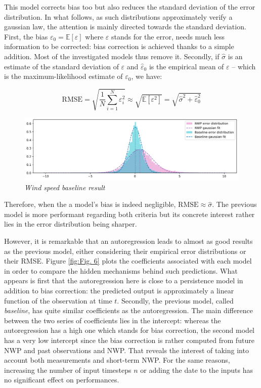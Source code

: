 \documentclass{article}
\newcommand{\saut}{\vspace{10px}}
\begin{document}
This model corrects bias too but also reduces the standard deviation of the error distribution. In what follows,
as such distributions approximately verify a gaussian law, the attention is mainly directed towards the standard
deviation. First, the bias $\varepsilon_0 = \mathbb E [ \varepsilon ]$ where $\varepsilon$ stands for the error,
needs much less information to be corrected: bias correction is achieved thanks to a simple addition.
Most of the investigated models thus remove it. Secondly, if $\hat \sigma$ is an estimate
of the standard deviation of $\varepsilon$ and $\hat \varepsilon_0$ is the empirical mean
of $\varepsilon$ -- which is the maximum-likelihood estimate of $\varepsilon_0$, we have:

\saut

\[
	\mathrm{RMSE} = \sqrt{\frac{1}{N} \sum_{i = 1}^N \varepsilon^2_i} \approx \sqrt{ \mathbb E [\varepsilon^2] }
	= \sqrt{\hat \sigma^2 + \hat \varepsilon^2_0}
\]

\begin{figure}[H]
    \centering
    \includegraphics[width=\linewidth]{img/baseline.png}
    \caption{\textit{Wind speed baseline result}}
    \label{fig:Fig. 5}
\end{figure}

Therefore, when the a model's bias is indeed negligible, $\mathrm{RMSE} \approx \hat \sigma$.
The previous model is more performant regarding both criteria but its concrete interest
rather lies in the error distribution being sharper.

\saut

However, it is remarkable that an autoregression leads to almost as good results as the previous model, either
considering their empirical error distributions or their RMSE. Figure \ref{fig:Fig. 6} plots the coefficients associated with
each model in order to compare the hidden mechanisms behind such predictions. What appears is first that
the autoregression here is close to a persistence model in addition to bias correction: the predicted output is
approximately a linear function of the observation at time $t$. Secondly, the previous model, called \emph{baseline},
has quite similar coefficients as the autoregression. The main difference between the two series of coefficients
lies in the intercept: whereas the autoregression has a high one which stands for bias correction, the second model
has a very low intercept since the bias correction is rather computed from future NWP and past observations and NWP.
That reveals the interest of taking into account both measurements and short-term NWP. For the same reasons,
increasing the number of input timesteps $n$ or adding the date to the inputs has no significant effect on performances.
\end{document}
